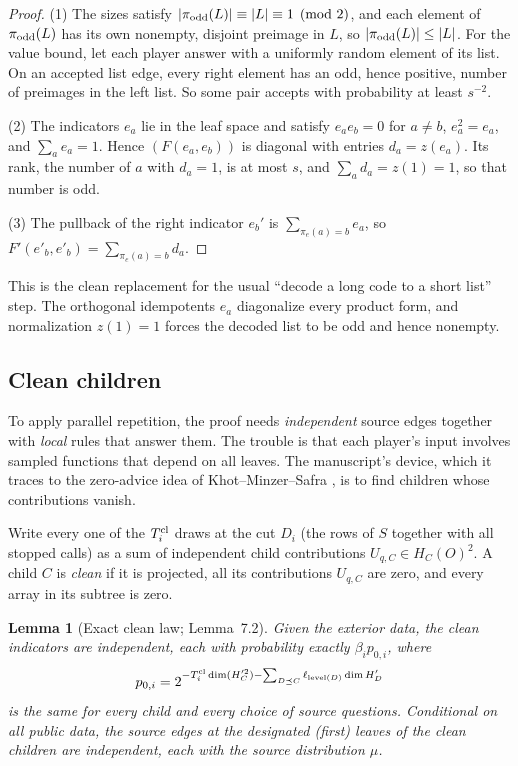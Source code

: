 \documentclass[11pt]{article}
\newtheorem{lemma}[theorem]{Lemma}
\theoremstyle{definition}
\theoremstyle{remark}
\begin{document}
\begin{proof}
(1) The sizes satisfy $|\pi_{\rm odd}(L)|\equiv|L|\equiv1\pmod 2$, and each
element of $\pi_{\rm odd}(L)$ has its own nonempty, disjoint preimage in $L$,
so $|\pi_{\rm odd}(L)|\le|L|$. For the value bound, let each player answer
with a uniformly random element of its list. On an accepted list edge, every
right element has an odd, hence positive, number of preimages in the left
list. So some pair accepts with probability at least $s^{-2}$.

(2) The indicators $e_a$ lie in the leaf space and satisfy $e_ae_b=0$ for
$a\ne b$, $e_a^2=e_a$, and $\sum_ae_a=1$. Hence $(F(e_a,e_b))$ is diagonal with
entries $d_a=z(e_a)$. Its rank, the number of $a$ with $d_a=1$, is at most
$s$, and $\sum_ad_a=z(1)=1$, so that number is odd.

(3) The pullback of the right indicator $e_b'$ is $\sum_{\pi_e(a)=b}e_a$, so
$F'(e'_b,e'_b)=\sum_{\pi_e(a)=b}d_a$.
\end{proof}

This is the clean replacement for the usual ``decode a long code to a short
list'' step. The orthogonal idempotents $e_a$ diagonalize every product form,
and normalization $z(1)=1$ forces the decoded list to be odd and hence
nonempty.

\subsection{Clean children}

To apply parallel repetition, the proof needs \emph{independent} source edges
together with \emph{local} rules that answer them. The trouble is that each
player's input involves sampled functions that depend on all leaves. The
manuscript's device, which it traces to the zero-advice idea of
Khot--Minzer--Safra \cite[Remark~3.2]{KMS17}, is to find children whose
contributions vanish.

Write every one of the $T_i^{\rm cl}$ draws at the cut $D_i$ (the rows of
$S$ together with all stopped calls) as a sum of independent child
contributions $U_{q,C}\in H_C(O)^2$. A child $C$ is \emph{clean} if it is
projected, all its contributions $U_{q,C}$ are zero, and every array in its
subtree is zero.

\begin{lemma}[Exact clean law; Lemma~7.2]\label{lem:clean-law}
Given the exterior data, the clean indicators are independent, each with
probability exactly $\beta_ip_{0,i}$, where
\[
 p_{0,i}=2^{-T_i^{\rm cl}\dim(H_C'^2)-\sum_{D\preceq C}\ell_{\mathrm{level}(D)}\dim H_D'}
\]
is the \emph{same for every child and every choice of source questions}.
Conditional on all public data, the source edges at the designated (first)
leaves of the clean children are independent, each with the source
distribution $\mu$.
\end{lemma}
\end{document}
